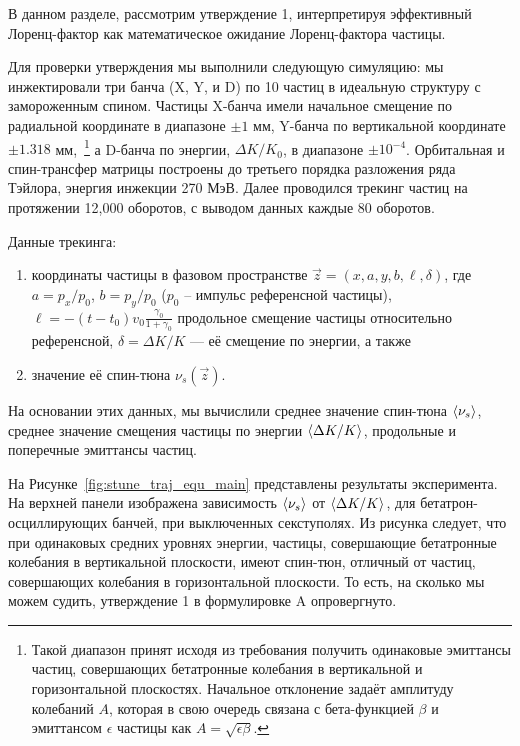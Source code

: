
В данном разделе, рассмотрим утверждение 1, интерпретируя эффективный Лоренц-фактор как математическое ожидание Лоренц-фактора частицы.

Для проверки утверждения мы выполнили следующую симуляцию: 
мы инжектировали три банча (X, Y, и D) по 10 частиц в идеальную структуру с замороженным спином. 
Частицы X-банча имели начальное смещение по радиальной координате 
в диапазоне $\pm 1$ мм, Y-банча по вертикальной координате $\pm 1.318$ мм,~\footnote{Такой диапазон 
	принят исходя из требования получить одинаковые эмиттансы частиц, 
	совершающих бетатронные колебания в вертикальной и горизонтальной плоскостях. 
	Начальное отклонение задаёт амплитуду колебаний $A$, 
	которая в свою очередь связана с бета-функцией  $\beta$ и эмиттансом $\epsilon$ частицы 
	как ${A = \sqrt{\epsilon \beta}}$. } а D-банча по энергии,  $\Delta K/K_0$, в диапазоне $\pm 10^{-4}$. 
Орбитальная и спин-трансфер матрицы построены до третьего порядка разложения ряда Тэйлора, 
энергия инжекции 270 МэВ.
Далее проводился трекинг частиц на протяжении 12,000 оборотов, с выводом данных каждые 80 оборотов. 

Данные трекинга: 
\begin{enumerate}[(1)]
	\item координаты частицы в фазовом пространстве ${\vec z = (x,a,y,b,\ell, \delta)}$, 
где ${a=p_x/p_0}$, ${b=p_y/p_0}$ ($p_0$ -- импульс референсной частицы),
${\ell = -(t-t_0)v_0\frac{\gamma_0}{1+\gamma_0}}$ продольное смещение частицы относительно референсной,
${\delta = \Delta K/K}$ --- её смещение по энергии, а также 
\item значение её спин-тюна ${\nu_s(\vec z)}$. 
\end{enumerate}
На основании этих данных, мы вычислили среднее значение спин-тюна $\avg{\nu_s}$, 
среднее значение смещения частицы по энергии $\avg{\Delta K/K}$, продольные и поперечные эмиттансы частиц.

На Рисунке~\ref{fig:stune_traj_equ_main} представлены результаты эксперимента. На верхней панели изображена зависимость $\avg{\nu_s}$ от $\avg{\Delta K/K}$, для бетатрон-осциллирующих банчей, при выключенных секступолях. Из рисунка следует, что при одинаковых средних уровнях энергии, частицы, совершающие бетатронные колебания в вертикальной плоскости, имеют спин-тюн, отличный от частиц, совершающих колебания в горизонтальной плоскости. То есть, на сколько мы можем судить, утверждение 1 в формулировке A опровергнуто.

